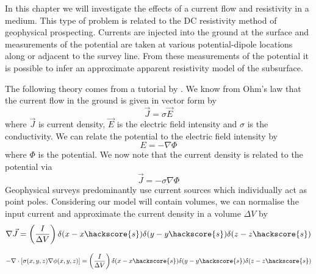 
%
%
%

In this chapter we will investigate the effects of a current flow and
resistivity in a medium. This type of problem is related to the DC resistivity method of
geophysical prospecting. Currents are injected into the ground at the surface
and measurements of the potential are taken at various potential-dipole
locations along or adjacent to the survey line. From these measurements of the
potential it is possible to infer an approximate apparent resistivity model of
the subsurface.

The following theory comes from a tutorial by \citet{Loke2004}.
We know from Ohm's law that the current flow in the ground is given in vector
form by
\begin{equation}
\vec{J}=\sigma\vec{E}
\end{equation}
where $\vec{J}$ is current density, $\vec{E}$ is the electric field intensity
and $\sigma$ is the conductivity. We can relate the potential to the electric
field intensity by 
\begin{equation}
E=-\nabla\Phi
\end{equation}
where $\Phi$ is the potential. We now note that the current density is related
to the potential via
\begin{equation}
\vec{J}=-\sigma\nabla\Phi
\end{equation}
Geophysical surveys predominantly use current sources which individually act as
point poles. Considering our model will contain volumes, we can normalise the
input current and approximate the current density in a volume $\Delta V$ by
\begin{equation}
\nabla \vec{J} =
\left(\frac{I}{\Delta V} \right) \delta(x-x\hackscore{s})
								 \delta(y-y\hackscore{s})
								 \delta(z-z\hackscore{s})								 
\end{equation}

\begin{equation}
-\nabla \cdot \left[ \sigma(x,y,z) \nabla \phi (x,y,z) \right] =
\left(\frac{I}{\Delta V} \right) \delta(x-x\hackscore{s})
								 \delta(y-y\hackscore{s})
								 \delta(z-z\hackscore{s})								 
\end{equation}

